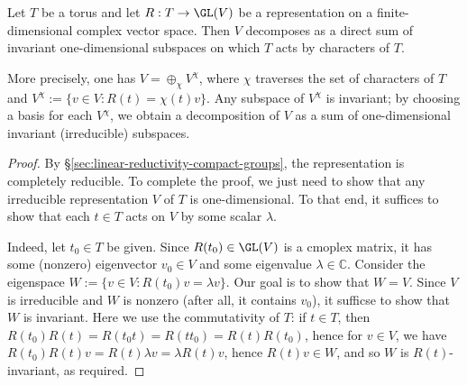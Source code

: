 \documentclass[reqno]{amsart} 
\begin{document}
\begin{lemma}
  Let $T$ be a torus and let $R : T \rightarrow \GL(V)$ be a representation on a finite-dimensional complex vector space.  Then $V$ decomposes as a direct sum of invariant one-dimensional subspaces on which $T$ acts by characters of $T$.

  More precisely, one has $V = \oplus_\chi V^\chi$, where $\chi$ traverses the set of characters of $T$ and $V^\chi := \{v \in V : R(t) = \chi(t) v\}$.  Any subspace of $V^\chi$ is invariant; by choosing a basis for each $V^\chi$, we obtain a decomposition of $V$ as a sum of one-dimensional invariant (irreducible) subspaces.
\end{lemma}
\begin{proof}
  By \S\ref{sec:linear-reductivity-compact-groups}, the representation is completely reducible.  To complete the proof, we just need to show that any irreducible representation $V$ of $T$ is one-dimensional.  To that end, it suffices to show that each $t \in T$ acts on $V$ by some scalar $\lambda$.

  Indeed, let $t_0 \in T$ be given.  Since $R(t_0) \in \GL(V)$ is a cmoplex matrix, it has some (nonzero) eigenvector $v_0 \in V$ and some eigenvalue $\lambda \in \mathbb{C}$.  Consider the eigenspace $W := \{v \in V : R(t_0) v = \lambda v \}$.  Our goal is to show that $W = V$.  Since $V$ is irreducible and $W$ is nonzero (after all, it contains $v_0$), it sufficse to show that $W$ is invariant.  Here we use the commutativity of $T$: if $t \in T$, then $R(t_0) R(t) = R(t_0 t) = R(t t_0) = R(t) R(t_0)$, hence for $v \in V$, we have $R(t_0) R(t) v = R(t) \lambda v = \lambda R(t) v$, hence $R(t) v \in W$, and so $W$ is $R(t)$-invariant, as required.
\end{proof}
\end{document}
